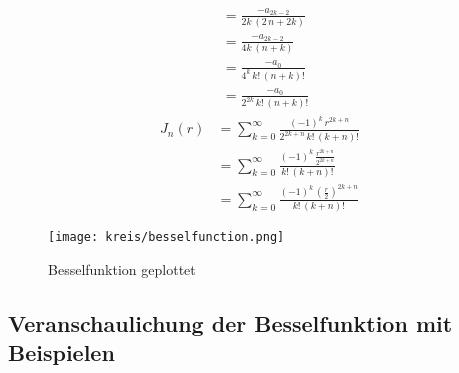 \begin{refsection}
\begin{align*}
	&=
	\frac
	{
		-a_{2k - 2}
	}{
		2k \, \left( 2 \, n + 2k \right)	
	} \\
	&=
	\frac
	{
		-a_{2k - 2}
	}{
		4k \, \left( n + k \right)	
	} \\
	&=
	\frac
	{
		-a_0
	}{
		4^k \, {k}! \, {\left( n + k \right)}!
	} \\
	&=
	\frac
	{
		-a_0
	}{
		2^{2k} \, {k}! \, {\left( n + k \right)}!
	}
\end{align*}
\begin{align}
	J_n \left( r \right)
	&= \nonumber
	\sum_{k=0} ^{\infty}
	\frac
	{
		\left( - 1 \right) ^k \, r ^{2k+n}
	}{
		2^{2k+n} \, {k}! \, { \left( k + n \right) }!
	} \\
	&=
	\sum_{k=0} ^{\infty}
	\frac
	{
		\left( - 1 \right) ^k \, 
		\frac
		{
			r ^{2k+n}
		}{
			2^{2k+n}
		}
	}{
		{k}! \, { \left( k + n \right) }!
	} \\
	&=
	\sum_{k=0} ^{\infty}
	\frac
	{
		\left( - 1 \right) ^k \, 
		\left(		
		\frac
		{
			r
		}{
			2
		} \right) ^{2k+n}
	}{
		{k}! \, { \left( k + n \right) }!
	}
	\label{eq:bessel_summenformel}
\end{align}


\begin{figure}
	\texttt{[image: kreis/besselfunction.png]}
	\label{img:besselfunction}
	\caption[Besselfunktion]{Besselfunktion geplottet}
\end{figure}

\subsection{Veranschaulichung der Besselfunktion mit Beispielen}

\printbibliography[heading=subbibliography]
\end{refsection}

